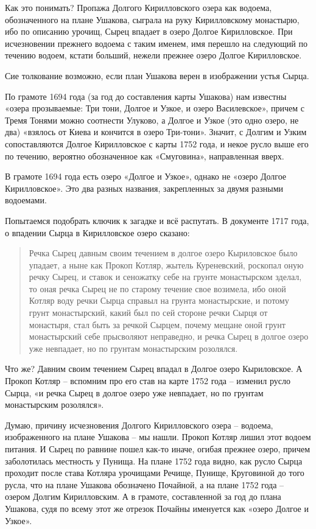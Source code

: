 Как это понимать? Пропажа Долгого Кирилловского озера как водоема, обозначенного на плане Ушакова, сыграла на руку Кирилловскому монастырю, ибо по описанию урочищ, Сырец впадает в озеро Долгое Кирилловское. При исчезновении прежнего водоема с таким именем, имя перешло на следующий по течению водоем, кстати больший, нежели прежнее озеро Долгое Кирилловское.

Сие толкование возможно, если план Ушакова верен в изображении устья Сырца. 

По грамоте 1694 года (за год до составления карты Ушакова) нам известны «озера прозываемые: Три тони, Долгое и Узкое, и озеро Василевское», причем с Тремя Тонями можно соотнести Улуково, а Долгое и Узкое (это одно озеро, не два) «взялось от Киева и кончится в озеро Три-тони». Значит, с Долгим и Узким сопоставляются Долгое Кирилловское с карты 1752 года, и некое русло выше его по течению, вероятно обозначенное как «Смуговина», направленная вверх.

В грамоте 1694 года есть озеро «Долгое и Узкое», однако не «озеро Долгое Кирилловское». Это два разных названия, закрепленных за двумя разными водоемами.
 
Попытаемся подобрать ключик к загадке и всё распутать. В документе 1717 года\cite[вып. 6, стр. 59]{histmatkiev}, о впадении Сырца в Кирилловское озеро сказано:

\begin{quotation}
Речка Сырец давным своим течением в долгое озеро Кыриловское было упадает, а ныне как Прокоп Котляр, жытель Куреневский, роскопал оную речку Сырец, и ставок и сеножатку себе на грунте монастырском зделал, то оная речка Сырец не по старому течение свое возимела, ибо оной Котляр воду речки Сырца справыл на грунта монастырские, и потому грунт монастырский, какий был по сей стороне речки Сырця от монастыря, стал быть за речкой Сырцем, почему мещане оной грунт монастырский себе прысволяют неправедно, и речка Сырец в долгое озеро уже невпадает, но по грунтам монастырским розолялся.
\end{quotation}

Что же? Давним своим течением Сырец впадал в Долгое озеро Кыриловское. А Прокоп Котляр – вспомним про его став на карте 1752 года – изменил русло Сырца, «и речка Сырец в долгое озеро уже невпадает, но по грунтам монастырским розолялся».

Думаю, причину исчезновения Долгого Кирилловского озера – водоема, изображенного на плане Ушакова – мы нашли. Прокоп Котляр лишил этот водоем питания. И Сырец по равнине пошел как-то иначе, огибая прежнее озеро, причем заболотилась местность у Пунища. На плане 1752 года видно, как русло Сырца проходит после става Котляра урочищами Речище, Пунище, Круговиной до того русла, что на плане Ушакова обозначено Почайной, а на плане 1752 года – озером Долгим Кирилловским. А в грамоте, составленной за год до плана Ушакова, судя по всему этот же отрезок Почайны именуется как «озеро Долгое и Узкое». 

